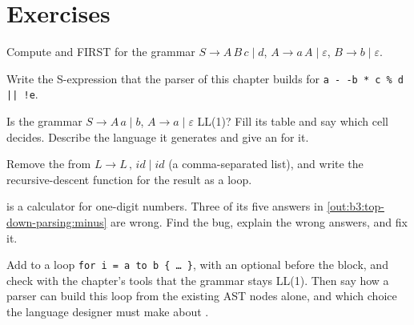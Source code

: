 \section{Exercises}\label{sec:b3:top-down-parsing:exercises}

\begin{exercise}[$\star$]\label{exo:b3:top-down-parsing:1}
Compute  and FIRST for the grammar $S \to A\,B\,c \mid d$, $A \to a\,A \mid \varepsilon$, $B \to b \mid \varepsilon$.
\end{exercise}

\begin{exercise}[$\star$]\label{exo:b3:top-down-parsing:2}
Write the S-expression that the parser of this chapter builds for \texttt{a - -b * c \% d || !e}.
\end{exercise}

\begin{exercise}[$\star$]\label{exo:b3:top-down-parsing:3}
Is the grammar $S \to A\,a \mid b$, $A \to a \mid \varepsilon$ LL(1)? Fill its table and say which cell decides. Describe the language it generates and give an  for it.
\end{exercise}

\begin{exercise}[$\star$]\label{exo:b3:top-down-parsing:4}
Remove the  from $L \to L\,,\,\mathit{id} \mid \mathit{id}$ (a comma-separated list), and write the recursive-descent function for the result as a loop.
\end{exercise}

\begin{exercise}[$\star\star$]\label{exo:b3:top-down-parsing:5}
 is a calculator for one-digit numbers. Three of its five answers in \cref{out:b3:top-down-parsing:minus} are wrong. Find the bug, explain the wrong answers, and fix it.
\label{lst:b3:top-down-parsing:minus}
\label{out:b3:top-down-parsing:minus}
\end{exercise}

\begin{exercise}[$\star\star$]\label{exo:b3:top-down-parsing:6}
Add to  a loop \texttt{for i = a to b \{ \dots\ \}}, with an optional  before the block, and check with the chapter's tools that the grammar stays LL(1). Then say how a parser can build this loop from the existing AST nodes alone, and which choice the language designer must make about .
\end{exercise}


